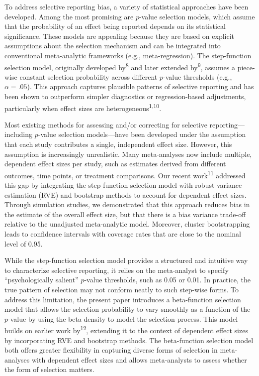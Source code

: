 \documentclass[
  american,
  man, donotrepeattitle,floatsintext]{apa7}
\begin{document}
To address selective reporting bias, a variety of statistical approaches have been developed. Among the most promising are \(p\)-value selection models, which assume that the probability of an effect being reported depends on its statistical significance. These models are appealing because they are based on explicit assumptions about the selection mechanism and can be integrated into conventional meta-analytic frameworks (e.g., meta-regression). The step-function selection model, originally developed by\textsuperscript{8} and later extended by\textsuperscript{9}, assumes a piece-wise constant selection probability across different \(p\)-value thresholds (e.g., \(\alpha = .05\)). This approach captures plausible patterns of selective reporting and has been shown to outperform simpler diagnostics or regression-based adjustments, particularly when effect sizes are heterogeneous\textsuperscript{1,10}.

Most existing methods for assessing and/or correcting for selective reporting---including \(p\)-value selection models---have been developed under the assumption that each study contributes a single, independent effect size. However, this assumption is increasingly unrealistic. Many meta-analyses now include multiple, dependent effect sizes per study, such as estimates derived from different outcomes, time points, or treatment comparisons. Our recent work\textsuperscript{11} addressed this gap by integrating the step-function selection model with robust variance estimation (RVE) and bootstrap methods to account for dependent effect sizes. Through simulation studies, we demonstrated that this approach reduces bias in the estimate of the overall effect size, but that there is a bias variance trade-off relative to the unadjusted meta-analytic model. Moreover, cluster bootstrapping leads to confidence intervals with coverage rates that are close to the nominal level of 0.95.

While the step-function selection model provides a structured and intuitive way to characterize selective reporting, it relies on the meta-analyst to specify ``psychologically salient'' \(p\)-value thresholds, such as 0.05 or 0.01. In practice, the true pattern of selection may not conform neatly to such step-wise forms. To address this limitation, the present paper introduces a beta-function selection model that allows the selection probability to vary smoothly as a function of the \(p\)-value by using the beta density to model the selection process. This model builds on earlier work by\textsuperscript{12}, extending it to the context of dependent effect sizes by incorporating RVE and bootstrap methods. The beta-function selection model both offers greater flexibility in capturing diverse forms of selection in meta-analyses with dependent effect sizes and allows meta-analysts to assess whether the form of selection matters.
\end{document}
